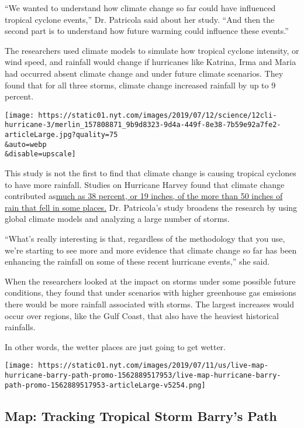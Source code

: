 ``We wanted to understand how climate change so far could have
influenced tropical cyclone events,'' Dr. Patricola said about her
study. ``And then the second part is to understand how future warming
could influence these events.''

The researchers used climate models to simulate how tropical cyclone
intensity, or wind speed, and rainfall would change if hurricanes like
Katrina, Irma and Maria had occurred absent climate change and under
future climate scenarios. They found that for all three storms, climate
change increased rainfall by up to 9 percent.

\texttt{[image: https://static01.nyt.com/images/2019/07/12/science/12cli-hurricane-3/merlin\_157808871\_9b9d8323-9d4a-449f-8e38-7b59e92a7fe2-articleLarge.jpg?quality=75\\\&auto=webp\\\&disable=upscale]}

This study is not the first to find that climate change is causing
tropical cyclones to have more rainfall. Studies on Hurricane Harvey
found that climate change contributed
as\href{https://www.nytimes.com/2017/12/13/climate/hurricane-harvey-climate-change.html}{much
as 38 percent, or 19 inches, of the more than 50 inches of rain that
fell in some places.} Dr. Patricola's study broadens the research by
using global climate models and analyzing a large number of storms.

``What's really interesting is that, regardless of the methodology that
you use, we're starting to see more and more evidence that climate
change so far has been enhancing the rainfall on some of these recent
hurricane events,'' she said.

When the researchers looked at the impact on storms under some possible
future conditions, they found that under scenarios with higher
greenhouse gas emissions there would be more rainfall associated with
storms. The largest increases would occur over regions, like the Gulf
Coast, that also have the heaviest historical rainfalls.

In other words, the wetter places are just going to get wetter.

\href{https://www.nytimes.com/interactive/2019/07/11/us/hurricane-barry-map-tracker.html}{}

\texttt{[image: https://static01.nyt.com/images/2019/07/11/us/live-map-hurricane-barry-path-promo-1562889517953/live-map-hurricane-barry-path-promo-1562889517953-articleLarge-v5254.png]}

\hypertarget{map-tracking-tropical-storm-barrys-path}{%
\subsection{Map: Tracking Tropical Storm Barry's
Path}\label{map-tracking-tropical-storm-barrys-path}}

